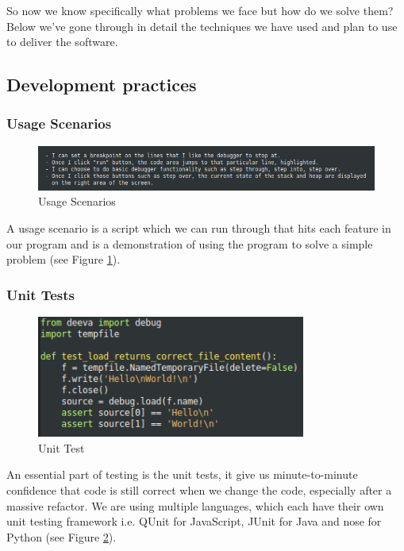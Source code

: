 \documentclass[11pt, a4paper]{article}
\begin{document}
So now we know specifically what problems we face but how do we solve them? Below we've gone through in detail the techniques we have used and plan to use to deliver the software. 
\subsection{Development practices}
\subsubsection{Usage Scenarios}
	
\begin{figure}[h]
\centering
\includegraphics[width = 160mm]{usage.png}
\caption{Usage Scenarios}
\label{fig:figure6}
\end{figure} 	
	
A usage scenario is a script which we can run through that hits each feature in our program and is a demonstration of using the program to solve a simple problem (see Figure \ref{fig:figure6}).

\subsubsection{Unit Tests}
	
\begin{figure}[h]
\centering
\includegraphics[height =40mm, width = 85 mm]{unit_test.png}
\caption{Unit Test}
\label{fig:figure5}
\end{figure} 	
	
An essential part of testing is the unit tests, it give us minute-to-minute confidence that code is still correct when we change the code, especially after a massive refactor. We are using multiple languages, which each have their own unit testing framework i.e. QUnit for JavaScript, JUnit for Java and nose for Python (see Figure \ref{fig:figure5}).
\end{document}
